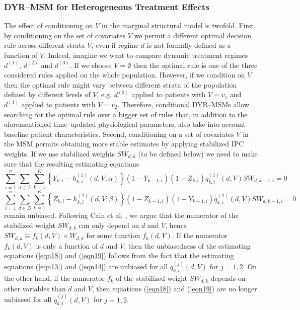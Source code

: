 \documentclass[12pt]{article}
\begin{document}
\subsubsection{DYR--MSM for Heterogeneous Treatment Effects}\label{subsection:label1}

The effect of conditioning on $V$ in the marginal structural model is twofold. First, by conditioning on the set of covariates $V$ we permit a different optimal decision rule across different strata $V$, even if regime $d$ is not formally defined as a function of $V$. Indeed, imagine we want to compare dynamic treatment regimes $d^{(1)}$, $d^{(2)}$ and $d^{(3)}$. If we choose $V = \emptyset$ then the optimal rule is one of the three considered rules applied on the whole population. However, if we condition on $V$ then the optimal rule might vary between different strata of the population defined by different levels of $V$, e.g. $d^{(3)}$ applied to patients with $V = v_1$ and $d^{(1)}$ applied to patients with $V = v_2$. Therefore, conditional DYR--MSMs allow searching for the optimal rule over a bigger set of rules that, in addition to the aforementioned time--updated physiological parameters, also take into account baseline patient characteristics. Second, conditioning on a set of covariates $V$ in the MSM permits obtaining more stable estimates by applying stabilized IPC weights. If we use stabilized weights $SW_{d,k}$ (to be defined below) we need to make sure that the resulting estimating equations 
\begin{equation}
\label{eqn18}
\sum_{i=1}^n \sum_{d \in \mathcal{D}} \sum_{k=1}^{K} \left\lbrace Y_{k, i} - h_{k,i}^{(1)} \left(d, V; \alpha \right) \right\rbrace \left( 1 - Y_{k-1,i} \right) \left( 1 - Z_{k,i} \right) q_{k,i}^{(1)} \left(d, V \right) SW_{d,k-1,i} = 0
\end{equation}
\begin{equation}
\label{eqn19}
\sum_{i=1}^n \sum_{d \in \mathcal{D}} \sum_{k=1}^{K} \left\lbrace Z_{k,i} - h_{k,i}^{(2)} \left(d, V; \beta \right) \right\rbrace \left( 1 - Z_{k-1,i} \right) \left( 1 - Y_{k-1,i} \right) q_{k,i}^{(2)} \left(d, V \right) SW_{d,k-1,i} = 0
\end{equation}
remain unbiased. Following Cain et al.  \cite{Cain2010}, we argue that the numerator of the stabilized weight $SW_{d,k}$ can only depend on $d$ and $V$, hence $SW_{d,k} \equiv f_{k} \left( d, V \right) \times W_{d,k}$ for some function $f_{k} \left( d, V \right)$. If the numerator $f_{k} \left( d, V \right)$ is only a function of $d$ and $V$, then the unbiasedness of the estimating equations (\ref{eqn18}) and (\ref{eqn19}) follows from the fact that the estimating equations (\ref{eqn13}) and (\ref{eqn14}) are unbiased for all $q_{k,i}^{(j)} \left( d, V \right)$ for $j=1,2$. On the other hand, if the numerator $f_{k}$ of the stabilized weight $SW_{d,k}$ depends on other variables than $d$ and $V$, then equations (\ref{eqn18}) and (\ref{eqn19}) are no longer unbiased for all $q_{k,i}^{(j)} \left( d, V \right)$ for $j=1,2$.
\end{document}

